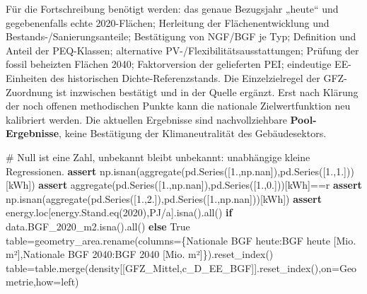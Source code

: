 \documentclass[
  ngerman,
  a4paper,
  DIV=11]{scrreprt}
\newenvironment{Shaded}{\begin{snugshade}}{\end{snugshade}}
\newcommand{\BuiltInTok}[1]{\textcolor[rgb]{0.00,0.23,0.31}{#1}}
\newcommand{\CommentTok}[1]{\textcolor[rgb]{0.37,0.37,0.37}{#1}}
\newcommand{\ControlFlowTok}[1]{\textcolor[rgb]{0.00,0.23,0.31}{\textbf{#1}}}
\newcommand{\FloatTok}[1]{\textcolor[rgb]{0.68,0.00,0.00}{#1}}
\newcommand{\NormalTok}[1]{\textcolor[rgb]{0.00,0.23,0.31}{#1}}
\newcommand{\OperatorTok}[1]{\textcolor[rgb]{0.37,0.37,0.37}{#1}}
\newcommand{\StringTok}[1]{\textcolor[rgb]{0.13,0.47,0.30}{#1}}
\newcommand{\VariableTok}[1]{\textcolor[rgb]{0.07,0.07,0.07}{#1}}
\begin{document}
Für die Fortschreibung benötigt werden: das genaue Bezugsjahr „heute``
und gegebenenfalls echte 2020-Flächen; Herleitung der Flächenentwicklung
und Bestands-/Sanierungsanteile; Bestätigung von NGF/BGF je Typ;
Definition und Anteil der PEQ-Klassen; alternative
PV-/Flexibilitätsausstattungen; Prüfung der fossil beheizten Flächen
2040; Faktorversion der gelieferten PEI; eindeutige EE-Einheiten des
historischen Dichte-Referenzstands. Die Einzelzielregel der
GFZ-Zuordnung ist inzwischen bestätigt und in der Quelle ergänzt. Erst
nach Klärung der noch offenen methodischen Punkte kann die nationale
Zielwertfunktion neu kalibriert werden. Die aktuellen Ergebnisse sind
nachvollziehbare \textbf{Pool-Ergebnisse}, keine Bestätigung der
Klimaneutralität des Gebäudesektors.

\begin{Shaded}
\begin{Highlighting}[]
\CommentTok{\# Null ist eine Zahl, unbekannt bleibt unbekannt: unabhängige kleine Regressionen.}
\ControlFlowTok{assert}\NormalTok{ np.isnan(aggregate(pd.Series([}\FloatTok{1.}\NormalTok{,np.nan]),pd.Series([}\FloatTok{1.}\NormalTok{,}\FloatTok{1.}\NormalTok{]))[}\StringTok{\textquotesingle{}kWh\textquotesingle{}}\NormalTok{])}
\ControlFlowTok{assert}\NormalTok{ aggregate(pd.Series([}\FloatTok{1.}\NormalTok{,np.nan]),pd.Series([}\FloatTok{1.}\NormalTok{,}\FloatTok{0.}\NormalTok{]))[}\StringTok{\textquotesingle{}kWh\textquotesingle{}}\NormalTok{]}\OperatorTok{==}\NormalTok{r}
\ControlFlowTok{assert}\NormalTok{ np.isnan(aggregate(pd.Series([}\FloatTok{1.}\NormalTok{,}\FloatTok{2.}\NormalTok{]),pd.Series([}\FloatTok{1.}\NormalTok{,np.nan]))[}\StringTok{\textquotesingle{}kWh\textquotesingle{}}\NormalTok{])}
\ControlFlowTok{assert}\NormalTok{ energy.loc[energy.Stand.eq(}\StringTok{\textquotesingle{}2020\textquotesingle{}}\NormalTok{),}\StringTok{\textquotesingle{}PJ/a\textquotesingle{}}\NormalTok{].isna().}\BuiltInTok{all}\NormalTok{() }\ControlFlowTok{if}\NormalTok{ data.BGF\_2020\_m2.isna().}\BuiltInTok{all}\NormalTok{() }\ControlFlowTok{else} \VariableTok{True}
\NormalTok{table}\OperatorTok{=}\NormalTok{geometry\_area.rename(columns}\OperatorTok{=}\NormalTok{\{}\StringTok{\textquotesingle{}Nationale BGF heute\textquotesingle{}}\NormalTok{:}\StringTok{\textquotesingle{}BGF heute [Mio. m²]\textquotesingle{}}\NormalTok{,}\StringTok{\textquotesingle{}Nationale BGF 2040\textquotesingle{}}\NormalTok{:}\StringTok{\textquotesingle{}BGF 2040 [Mio. m²]\textquotesingle{}}\NormalTok{\}).reset\_index()}
\NormalTok{table}\OperatorTok{=}\NormalTok{table.merge(density[[}\StringTok{\textquotesingle{}GFZ\_Mittel\textquotesingle{}}\NormalTok{,}\StringTok{\textquotesingle{}c\_D\_EE\_BGF\textquotesingle{}}\NormalTok{]].reset\_index(),on}\OperatorTok{=}\StringTok{\textquotesingle{}Geometrie\textquotesingle{}}\NormalTok{,how}\OperatorTok{=}\StringTok{\textquotesingle{}left\textquotesingle{}}\NormalTok{)}

\end{Highlighting}
\end{Shaded}
\end{document}
